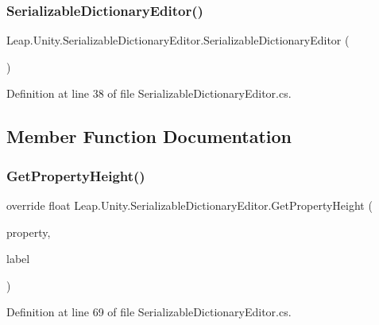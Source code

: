 \subsubsection{\texorpdfstring{SerializableDictionaryEditor()}{SerializableDictionaryEditor()}}
{\footnotesize\ttfamily Leap.\+Unity.\+Serializable\+Dictionary\+Editor.\+Serializable\+Dictionary\+Editor (\begin{DoxyParamCaption}{ }\end{DoxyParamCaption})}



Definition at line 38 of file Serializable\+Dictionary\+Editor.\+cs.



\subsection{Member Function Documentation}
\mbox{\label{class_leap_1_1_unity_1_1_serializable_dictionary_editor_a7ba45bda36cd2ad85eec1b240f384976}} 
\subsubsection{\texorpdfstring{GetPropertyHeight()}{GetPropertyHeight()}}
{\footnotesize\ttfamily override float Leap.\+Unity.\+Serializable\+Dictionary\+Editor.\+Get\+Property\+Height (\begin{DoxyParamCaption}\item[{Serialized\+Property}]{property,  }\item[{G\+U\+I\+Content}]{label }\end{DoxyParamCaption})}



Definition at line 69 of file Serializable\+Dictionary\+Editor.\+cs.

\mbox{\label{class_leap_1_1_unity_1_1_serializable_dictionary_editor_ad60f559bff4eb2c058a9a356ded02bb7}} 
